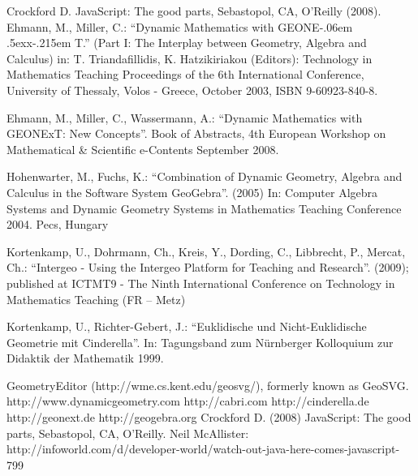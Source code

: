 \documentclass[12pt,a4paper]{article}%
\def\GEONExT{GEONE\kern-.06em \lower.5ex\hbox{x}\kern-.215em T}
\begin{document}
\begin{thebibliography}{99}
     Crockford D. JavaScript: The good parts, Sebastopol, CA, O'Reilly (2008).
     Ehmann, M., Miller, C.: ``Dynamic Mathematics with \GEONExT.''
        (Part I: The Interplay between Geometry, Algebra and Calculus)
        in: T. Triandafillidis, K. Hatzikiriakou (Editors): Technology in Mathematics Teaching
        Proceedings of the 6th International Conference, University of Thessaly, Volos - Greece, October 2003, ISBN 9-60923-840-8.    
 
     Ehmann, M., Miller, C., Wassermann, A.: ``Dynamic Mathematics with GEONExT: New Concepts''. Book of Abstracts, 4th European Workshop on Mathematical \& Scientific e-Contents
    September 2008.   

     Hohenwarter, M., Fuchs, K.: ``Combination of Dynamic Geometry, Algebra and Calculus in the Software System GeoGebra''. (2005) In: Computer Algebra Systems and Dynamic Geometry Systems in Mathematics Teaching Conference 2004. Pecs, Hungary 

     Kortenkamp, U., Dohrmann, Ch., Kreis, Y., Dording, C., Libbrecht, P., Mercat, Ch.: ``Intergeo - Using the Intergeo Platform for Teaching and Research''. (2009); published at ICTMT9 - The Ninth International Conference on Technology in Mathematics Teaching (FR – Metz)

     Kortenkamp, U., Richter-Gebert, J.: ``Euklidische und Nicht-Euklidische Geometrie mit Cinderella''. In: Tagungsband zum N\"{u}rnberger Kolloquium zur Didaktik der Mathematik 1999.


     GeometryEditor (http://wme.cs.kent.edu/geosvg/), formerly known as GeoSVG.
     http://www.dynamicgeometry.com
     http://cabri.com 
     http://cinderella.de 
     http://geonext.de 
     http://geogebra.org
     Crockford D. (2008) JavaScript: The good parts, Sebastopol, CA, O'Reilly.
     Neil McAllister: http://infoworld.com/d/developer-world/watch-out-java-here-comes-javascript-799
\end{thebibliography}
\end{document}
